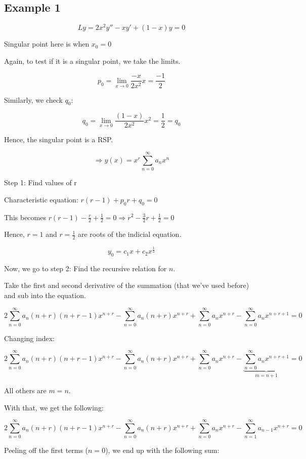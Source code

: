 \documentclass{article}
\begin{document}
\subsection{Example 1}

$$Ly = 2x^2 y'' - x y' + (1-x)y = 0$$

Singular point here is when $x_0 = 0$

Again, to test if it is a singular point, we take the limits. 

$$p_0 = \lim_{x \to 0} \frac{-x}{2x^2} x = \frac{-1}{2}$$

Similarly, we check $q_0$:

$$q_0 = \lim_{x \to 0} \frac{(1-x)}{2x^2} x^2 = \frac{1}{2} = q_0$$

Hence, the singular point is a RSP. 

$$\Rightarrow y(x) = x^r \sum_{n = 0}^\infty a_n x^n$$

Step 1: Find values of r

Characteristic equation: $r(r-1) + p_0 r + q_0 = 0$

This becomes $r(r-1) - \frac{r}{2} + \frac{1}{2} = 0 \Rightarrow r^2 - \frac{3}{2} r + \frac{1}{2} = 0$

Hence, $r = 1$ and $r = \frac{1}{2}$ are roots of the indicial equation. 

$$y_0 = c_1 x + c_2 x^{\frac{1}{2}}$$

Now, we go to step 2: Find the recursive relation for $n$. 

Take the first and second derivative of the summation (that we've used before) and sub into the equation. 

$$2\sum_{n = 0}^{\infty} a_n (n+r)(n+r-1) x^{n+r} - \sum_{n = 0}^{\infty} a_n (n+r) x^{n+r} + \sum_{n = 0}^\infty a_n x^{n+r} - \sum_{n = 0}^\infty a_n x^{n+r+1} = 0$$

Changing index:

$$2\sum_{n = 0}^{\infty} a_n (n+r)(n+r-1) x^{n+r} - \sum_{n = 0}^{\infty} a_n (n+r) x^{n+r} + \sum_{n = 0}^\infty a_n x^{n+r} - \underbrace{\sum_{n = 0}^\infty a_n x^{n+r+1}}_{m = n+1} = 0$$

All others are $m = n$. 

With that, we get the following:

$$2\sum_{n = 0}^{\infty} a_n (n+r)(n+r-1) x^{n+r} - \sum_{n = 0}^{\infty} a_n (n+r) x^{n+r} + \sum_{n = 0}^\infty a_n x^{n+r} - \sum_{n = 1}^\infty a_{n-1} x^{n+r} = 0$$

Peeling off the first terms ($n=0$), we end up with the following sum:
\end{document}
